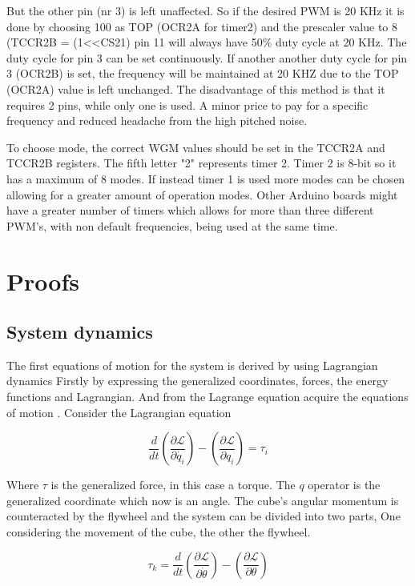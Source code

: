 \documentclass[a4paper,11pt]{kth-mag}
\begin{document}
But the other pin (nr 3) is left unaffected. So if the desired PWM is 20 KHz it is done by choosing 100 
as TOP (OCR2A for timer2) and the prescaler value to 8 (TCCR2B = (1<<CS21) pin 11 will always have 50\% duty cycle at 20 KHz. The duty cycle for pin 3 can be set continuously. If another another duty cycle for pin 3
(OCR2B) is set, the frequency will be  maintained at 20 KHZ due to the TOP (OCR2A) value is left  unchanged. The disadvantage of this method is that it requires 2 pins, while only one is used. A minor price to pay for a specific frequency and reduced headache from the high pitched noise.

To choose mode, the correct WGM values should be set in the TCCR2A and TCCR2B registers. The fifth letter "2" represents timer 2. Timer 2 is 8-bit so it has a maximum of 8 modes. If instead timer 1 is 
used more modes can be chosen allowing for a greater amount of operation modes. Other Arduino boards might have a greater number of timers which allows for more than three different PWM's, with non default frequencies, being used at the same time.


\chapter{Proofs} \label{appB}

\section{System dynamics} \label{app: system dyn}
The first equations of motion for the system is derived by using Lagrangian dynamics Firstly by expressing the generalized coordinates, forces, the energy functions and Lagrangian. And from the Lagrange equation  \cite{Lagrangeref} acquire the equations of motion . Consider the Lagrangian equation

\begin{equation}
\frac{d}{dt}\left(\frac{\partial \mathcal{L}}{\partial \dot{q_i}}\right)-\left(\frac{\partial \mathcal{L}}{\partial q_i}\right) = \tau_i
\end{equation}

Where $\tau$ is the generalized force, in this case a torque. The $q$ operator is the generalized coordinate which now is an angle. The cube's angular momentum is counteracted by the flywheel and the system can be divided into two parts, One considering the movement of the cube, the other the flywheel.

\begin{equation} \label{eq:positiveL}
\tau_k=\frac{d}{dt}\left(\frac{\partial \mathcal{L}}{\partial \dot{\theta}}\right)-\left(\frac{\partial \mathcal{L}}{\partial \theta}\right)
\end{equation}
\end{document}

